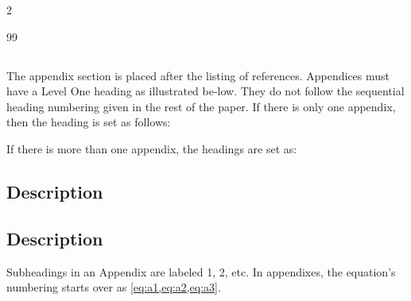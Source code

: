 \documentclass[fleqn]{2026SCGE}
\begin{document}
\begin{multicols}{2}
\begin{thebibliography}{99}
\end{thebibliography}

\begin{appendix}






\renewcommand{\thesection}{Appendix}


\section{}



The appendix section is placed after the listing of references.
Appendices must have a Level One heading as illustrated be-low.
They do not follow the sequential heading numbering given in the rest of the paper.
If there is only one appendix, then the heading is set as follows:







If there is more than one appendix, the headings are set as:


\subsection{\label{sec:level1} Description}

\subsection{\label{sec:level2} Description}
Subheadings in an Appendix are labeled 1, 2, etc. In appendixes, the equation's
numbering starts over as \cref{eq:a1,eq:a2,eq:a3}.


\end{appendix}
\end{multicols}
\end{document}
